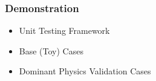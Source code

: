 \begin{frame}
\frametitle{Demonstration}

\begin{itemize} 
\item Unit Testing Framework 
\item Base (Toy) Cases
\item Dominant Physics Validation Cases
\end{itemize}

\end{frame}
